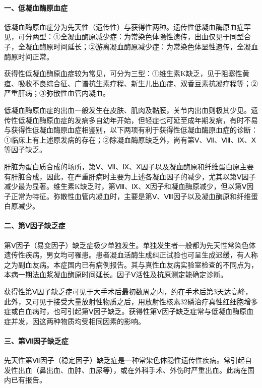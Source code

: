 \paragraph{一、低凝血酶原血症}

低凝血酶原血症分为先天性（遗传性）与获得性两种。遗传性低凝血酶原血症罕见，可分两型：①全凝血酶原减少症：为常染色体隐性遗传，出血仅见于同型合子，全凝血酶原时间延长；②游离凝血酶原减少症：为常染色体显性遗传，全凝血酶原时间正常。

获得性低凝血酶原血症较为常见，可分为三型：①维生素K缺乏，见于阻塞性黄疸、吸收不良综合征、广谱抗生素疗程、新生儿出血症、双香豆素抗凝疗程等；②严重肝病；③弥散性血管内凝血。

低凝血酶原血症的出血一般发生在皮肤、肌肉及黏膜，关节内出血则极其少见。遗传性低凝血酶原血症的发病多自幼年开始，但轻症也可延至成年期发病，有时不易与获得性低凝血酶原血症相鉴别，以下两项有利于获得性低凝血酶原血症的诊断：①临床上有上述原发病的存在；②除凝血酶原缺乏外，尚有第Ⅴ、Ⅶ、Ⅷ、Ⅸ、Ⅹ等因子缺乏。

肝脏为蛋白质合成的场所，第Ⅴ、Ⅶ、Ⅸ、Ⅹ因子以及凝血酶原和纤维蛋白原主要有肝脏合成，因此，在严重肝病时主要为上述各凝血因子的减少，尤其以第Ⅴ因子减少最为显著。维生素K缺乏时，第Ⅷ、Ⅸ、Ⅹ因子和凝血酶原减少，但以第Ⅴ因子正常为特征。弥散性血管内凝血时，主要是第Ⅴ、Ⅷ因子以及凝血酶原和纤维蛋白原减少。

\paragraph{二、第Ⅴ因子缺乏症}

第Ⅴ因子（易变因子）缺乏症极少单独发生。单独发生者一般都为先天性常染色体遗传性疾病，男女均可罹患。患者凝血活酶生成纠正试验也可呈生成迟缓，有人称之为副血友病。本症国内已有病例报告。其与真性血友病实验室检查的不同点为，本病一期法血浆凝血酶原时间延长。因子Ⅴ活性及抗原测定能确定诊断。

获得性第Ⅴ因子缺乏症可见于大手术后最初数周之内，约在手术后第3天达高峰，此外，又可见于接受大量放射性物质之后，用放射性核素32磷治疗真性红细胞增多症或白血病时，也可引起第Ⅴ因子缺乏。获得性第Ⅴ因子缺乏症常与低凝血酶原血症并发，因这两种物质均受相同因素的影响。

\paragraph{三、第Ⅶ因子缺乏症}

先天性第Ⅶ因子（稳定因子）缺乏症是一种常染色体隐性遗传性疾病。常引起自发性出血（鼻出血、血肿、血尿等），或在外科手术、外伤时严重出血。此病在国内已有报告。

